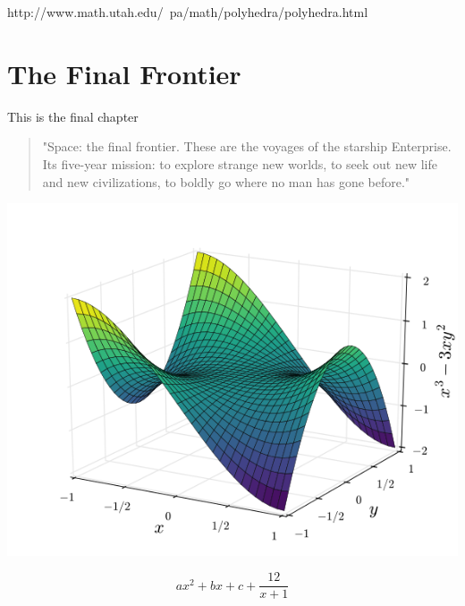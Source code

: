 \documentclass[openany,a4paper,12pt]{book}
\begin{document}
http://www.math.utah.edu/~pa/math/polyhedra/polyhedra.html
\chapter{The Final Frontier}
This is the final chapter
\begin{quotation}
"Space: \cite{greenwade93:1} the final frontier. These are the voyages of the starship Enterprise. Its five-year mission: to explore strange new worlds, to seek out new life and new civilizations, to boldly go where no man has gone before." \cite{AbedonHymanThomas03:4}
\end{quotation}
\begin{center}
\includegraphics[angle=0,scale=0.6]{picture4.png}
\end{center}

$$ax^2+bx+c+\dfrac{12}{x+1}$$
\end{document}
